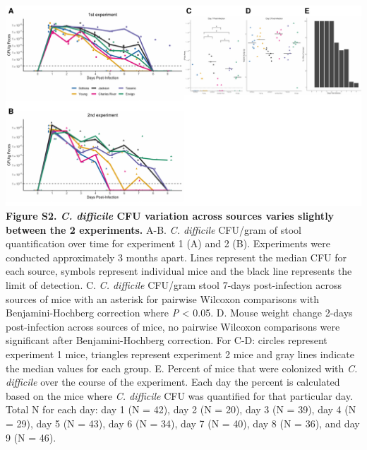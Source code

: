 \documentclass[
  11pt,
]{article}
\begin{document}
\newpage

\includegraphics{figure_S2.pdf} \textbf{Figure S2. \emph{C. difficile}
CFU variation across sources varies slightly between the 2 experiments.}
A-B. \emph{C. difficile} CFU/gram of stool quantification over time for
experiment 1 (A) and 2 (B). Experiments were conducted approximately 3
months apart. Lines represent the median CFU for each source, symbols
represent individual mice and the black line represents the limit of
detection. C. \emph{C. difficile} CFU/gram stool 7-days post-infection
across sources of mice with an asterisk for pairwise Wilcoxon
comparisons with Benjamini-Hochberg correction where \emph{P}
\textless{} 0.05. D. Mouse weight change 2-days post-infection across
sources of mice, no pairwise Wilcoxon comparisons were significant after
Benjamini-Hochberg correction. For C-D: circles represent experiment 1
mice, triangles represent experiment 2 mice and gray lines indicate the
median values for each group. E. Percent of mice that were colonized
with \emph{C. difficile} over the course of the experiment. Each day the
percent is calculated based on the mice where \emph{C. difficile} CFU
was quantified for that particular day. Total N for each day: day 1 (N =
42), day 2 (N = 20), day 3 (N = 39), day 4 (N = 29), day 5 (N = 43), day
6 (N = 34), day 7 (N = 40), day 8 (N = 36), and day 9 (N = 46).

\newpage
\end{document}
